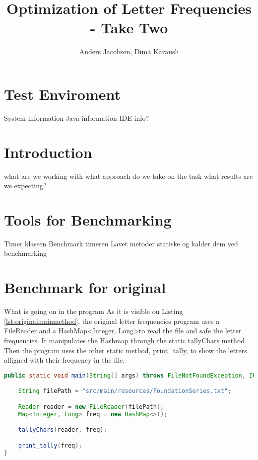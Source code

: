 \documentclass{article}
\author{Anders Jacobsen, Dima Karaush}
\title{Optimization of Letter Frequencies - Take Two}
\begin{document}

\maketitle

\tableofcontents

\section{Test Enviroment}
System information
Java information
IDE info? 

\section{Introduction}
what are we working with
what approach do we take on the task
what results are we expecting? 

\section{Tools for Benchmarking}
Timer klassen
Benchmark timeren
Lavet metoder statiske og kalder dem ved benchmarking

\section{Benchmark for original}
What is going on in the program
As it is visible on Listing \ref{lst:originalmainmethod}, the original letter frequencies program uses a FileReader 
and a HashMap\textless Integer, Long\textgreater \space to read the file and safe the letter frequencies. It 
manipulates the Hashmap through the static tallyChars method. Then the program uses 
the other static method, print\_tally, to show the letters alligned with their 
frequency in the file. 


\begin{lstlisting}[caption={The main method of the original Letter Frequncies program without optimizations},label={lst:originalmainmethod},language=Java]
public static void main(String[] args) throws FileNotFoundException, IOException {

    String filePath = "src/main/resources/FoundationSeries.txt";

    Reader reader = new FileReader(filePath);
    Map<Integer, Long> freq = new HashMap<>();

    tallyChars(reader, freq);

    print_tally(freq);
}
\end{lstlisting}
\end{document}
